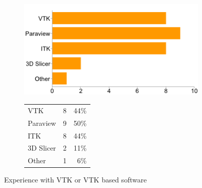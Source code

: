 \documentclass[MSc,paper=a4,pagesize=auto]{icldt}
\begin{document}
\clearpage
\begin{figure}[htbp!]
\centering
\begin{subfigure}{0.5\textwidth}
    \centering
    \includegraphics[width=1\linewidth]{resources/2-vtk_experience}
\end{subfigure}%
\centering
\begin{subfigure}{0.5\textwidth}
    \centering
   	\begin{tabular}{ l c r }
   	VTK 			& 8 & 44\% \\
  	Paraview 	& 9 & 50\% \\
	ITK 			& 8 & 44\% \\
	3D Slicer 	& 2 & 11\% \\
	Other 		&  1 & 6\% \\
\end{tabular}
\end{subfigure} 
    \caption{Experience with VTK or VTK based software}
    \label{fig:2-vtk_experience}
\end{figure}
\end{document}
